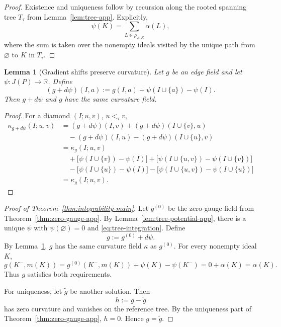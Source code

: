 \documentclass{article}
\newtheorem{lemma}[theorem]{Lemma}
\theoremstyle{definition}
\newcommand{\RR}{\mathbb R}
\begin{document}
\begin{proof}
Existence and uniqueness follow by recursion along the rooted spanning tree \(T_\tau\) from Lemma~\ref{lem:tree-app}. Explicitly,
\[
\psi(K)=\sum_{L\in \rho_{\varnothing,K}} \alpha(L),
\]
where the sum is taken over the nonempty ideals visited by the unique path from \(\varnothing\) to \(K\) in \(T_\tau\).
\end{proof}

\begin{lemma}[Gradient shifts preserve curvature]
\label{lem:gradient-app}
Let \(g\) be an edge field and let \(\psi:J(P)\to\RR\). Define
\begin{equation}
(g+d\psi)(I,a):=g(I,a)+\psi(I\cup\{a\})-\psi(I).
\label{eq:gradient-shift}
\end{equation}
Then \(g+d\psi\) and \(g\) have the same curvature field.
\end{lemma}

\begin{proof}
For a diamond \((I;u,v)\), \(u<_{\tau}v\),
\begin{align*}
\kappa_{g+d\psi}(I;u,v)
&=
(g+d\psi)(I,v)+(g+d\psi)(I\cup\{v\},u)\\
&\quad -(g+d\psi)(I,u)-(g+d\psi)(I\cup\{u\},v)\\
&=
\kappa_g(I;u,v)\\
&\quad
+\bigl[\psi(I\cup\{v\})-\psi(I)\bigr]
+\bigl[\psi(I\cup\{u,v\})-\psi(I\cup\{v\})\bigr]\\
&\quad
-\bigl[\psi(I\cup\{u\})-\psi(I)\bigr]
-\bigl[\psi(I\cup\{u,v\})-\psi(I\cup\{u\})\bigr]\\
&=
\kappa_g(I;u,v).
\end{align*}
\end{proof}

\begin{proof}[Proof of Theorem~\ref{thm:integrability-main}]
Let \(g^{(0)}\) be the zero-gauge field from Theorem~\ref{thm:zero-gauge-app}. By Lemma~\ref{lem:tree-potential-app}, there is a unique \(\psi\) with \(\psi(\varnothing)=0\) and \eqref{eq:tree-integration}. Define
\[
g:=g^{(0)}+d\psi.
\]
By Lemma~\ref{lem:gradient-app}, \(g\) has the same curvature field \(\kappa\) as \(g^{(0)}\). For every nonempty ideal \(K\),
\[
g(K^-,m(K))
=
g^{(0)}(K^-,m(K))+\psi(K)-\psi(K^-)
=
0+\alpha(K)
=
\alpha(K).
\]
Thus \(g\) satisfies both requirements.

For uniqueness, let \(\tilde g\) be another solution. Then
\[
h:=g-\tilde g
\]
has zero curvature and vanishes on the reference tree. By the uniqueness part of Theorem~\ref{thm:zero-gauge-app}, \(h=0\). Hence \(g=\tilde g\).
\end{proof}
\end{document}
